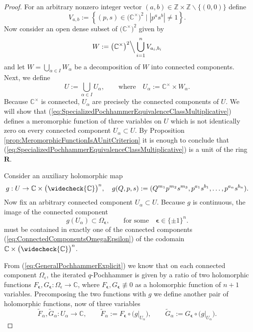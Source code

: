 \documentclass{amsart}
\begin{document}
\begin{proof}
For an arbitrary nonzero integer vector $(a,b)\in\mathbb Z\times\mathbb Z\backslash\{(0,0)\}$ define
\begin{equation*}
V_{a,b}:=\left\{(p,s)\in\big(\mathbb C^\times\big)^2\;\Big|\;|p^as^b|\neq1\right\}.
\end{equation*}
Now consider an open dense subset of $\big(\mathbb C^\times\big)^2$ given by
\begin{equation*}
W:=\big(\mathbb C^\times\big)^2\Big\backslash\bigcup_{i=1}^n V_{a_i,b_i}
\end{equation*}
and let $W=\bigcup_{\alpha\in I}W_\alpha$ be a decomposition of $W$ into connected components. Next, we define
\begin{equation*}
U:=\bigcup_{\alpha\in I}U_\alpha,\qquad\textrm{where}\quad U_\alpha:=\mathbb C^\times\times W_\alpha.
\end{equation*}
Because $\mathbb C^\times$ is connected, $U_\alpha$ are precisely the connected components of $U$. We will show that (\ref{eq:SpecializedPochhammerEquivalenceClassMultiplicative}) defines a meromorphic function of three variables on $U$ which is not identically zero on every connected component $U_\alpha\subset U$. By Proposition \ref{prop:MeromorphicFunctionIsAUnitCriterion} it is enough to conclude that (\ref{eq:SpecializedPochhammerEquivalenceClassMultiplicative}) is a unit of the ring $\mathbf R$.

Consider an auxiliary holomorphic map
\begin{equation*}
g:U\rightarrow\mathbb C\times\big(\widecheck{\mathbb C}\big)^n,\quad g(Q,p,s):=(Q^{m_1}p^{m_2}s^{m_3},p^{a_1}s^{b_1},\dots,p^{a_n}s^{b_n}).
\end{equation*}
Now fix an arbitrary connected component $U_\alpha\subset U$. Because $g$ is continuous, the image of the connected component
\begin{equation*}
g(U_\alpha)\subset \Omega_{\boldsymbol{\epsilon}},\qquad \textrm{for some}\quad  \boldsymbol{\epsilon}\in\{\pm1\}^n.
\end{equation*}
must be contained in exactly one of the connected components (\ref{eq:ConnectedComponentsOmegaEpsilon}) of the codomain $\mathbb C\times\big(\widecheck{\mathbb C}\big)^n$.

From (\ref{eq:GeneralPochhammerExplicit}) we know that on each connected component $\Omega_\epsilon$, the iterated $q$-Pochhammer is given by a ratio of two holomorphic functions $F_{\boldsymbol\epsilon},G_{\boldsymbol\epsilon}:\Omega_\epsilon\rightarrow\mathbb C$, where $F_{\boldsymbol\epsilon},G_{\boldsymbol\epsilon}\not\equiv0$ as a holomorphic function of $n+1$ variables. Precomposing the two functions with $g$ we define another pair of holomorphic functions, now of three variables
\begin{equation*}
\widetilde F_{\alpha},\widetilde G_{\alpha}: U_\alpha\rightarrow\mathbb C,\qquad \widetilde F_{\alpha}:=F_{\boldsymbol\epsilon}\circ \Big(g\big|_{U_\alpha}\Big),\qquad \widetilde G_{\alpha}:=G_{\boldsymbol\epsilon}\circ \Big(g\big|_{U_\alpha}\Big).
\end{equation*}


\end{proof}
\end{document}
